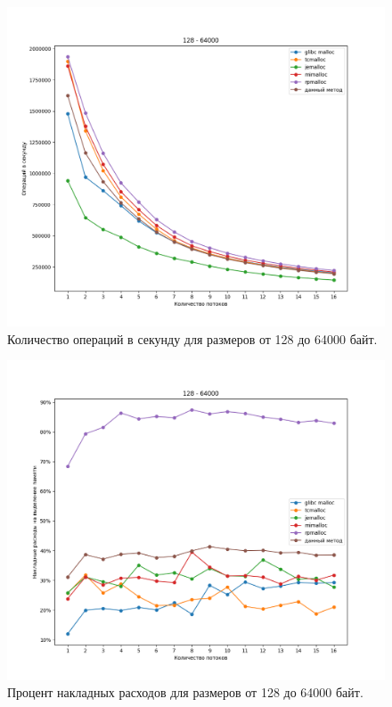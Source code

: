 \begin{figure}[!h]
	\begin{center}
		\includegraphics[width=1.0\linewidth, height=0.37\textheight]{images/128_64000_ops.png}
		\caption{Количество операций в секунду для размеров от 128 до 64000 байт.}
		\label{128_64000_ops}
	\end{center}
\end{figure}

\begin{figure}[!h]
	\begin{center}
		\includegraphics[width=1.0\linewidth, height=0.37\textheight]{images/128_64000_overhead.png}
		\caption{Процент накладных расходов для размеров от 128 до 64000 байт.}
		\label{128_64000_overhead}
	\end{center}
\end{figure}

